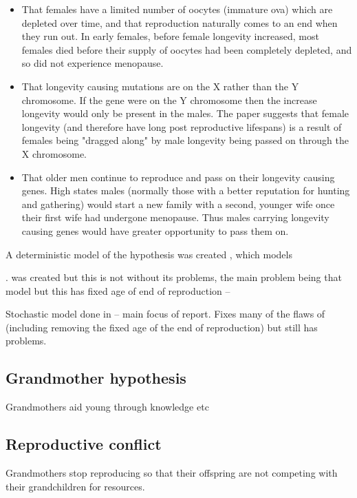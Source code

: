 \documentclass[authoryearcitations]{UoYCSproject}
\begin{document}
\begin{itemize}
\item That females have a limited number of oocytes (immature ova) which are depleted over time, and that reproduction naturally comes to an end when they run out. \cite{humanPopBio1994} In early females, before female longevity increased, most females died before their supply of oocytes had been completely depleted, and so did not experience menopause.
\item That longevity causing mutations are on the X rather than the Y chromosome. If the gene were on the Y chromosome then the increase longevity would only be present in the males. The paper suggests that female longevity (and therefore have long post reproductive lifespans) is a result of females being "dragged along" by male longevity being passed on through the X chromosome. 
\item That older men continue to reproduce and pass on their longevity causing genes. High states males (normally those with a better reputation for hunting and gathering) would start a new family with a second, younger wife once their first wife had undergone menopause. Thus males carrying longevity causing genes would have greater opportunity to pass them on.
\end{itemize}



A deterministic model of the hypothesis was created \cite{whyMenMatter2007}, which models

. was created but this is not without its problems, the main problem being that 
model but this has fixed age of end of reproduction -- 

Stochastic model done in \cite{mateChoice2013} -- main focus of report. Fixes many of the flaws of \cite{whyMenMatter2007} (including removing the fixed age of the end of reproduction) but still has problems.

\newpage
\subsection{Grandmother hypothesis}
Grandmothers aid young through knowledge etc

\subsection{Reproductive conflict}
Grandmothers stop reproducing so that their offspring are not competing with their grandchildren for resources. \cite{repConflictOrca2017}
\end{document}
